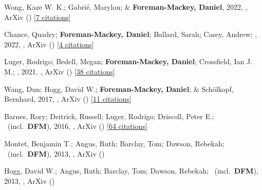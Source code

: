 \item[{\color{numcolor}\scriptsize7}] Wong, Kaze W. K.; Gabri{\'e}, Marylou; \& \textbf{Foreman-Mackey, Daniel}, 2022, , ArXiv () [\href{https://ui.adsabs.harvard.edu/abs/2022arXiv221106397W}{7 citations}]

\item[{\color{numcolor}\scriptsize6}] Chance, Quadry; \textbf{Foreman-Mackey, Daniel}; Ballard, Sarah; Casey, Andrew; \etal, 2022, , ArXiv () [\href{https://ui.adsabs.harvard.edu/abs/2022arXiv220611275C}{4 citations}]

\item[{\color{numcolor}\scriptsize5}] Luger, Rodrigo; Bedell, Megan; \textbf{Foreman-Mackey, Daniel}; Crossfield, Ian J. M.; \etal, 2021, , ArXiv () [\href{https://ui.adsabs.harvard.edu/abs/2021arXiv211006271L}{38 citations}]

\item[{\color{numcolor}\scriptsize4}] Wang, Dun; Hogg, David W.; \textbf{Foreman-Mackey, Daniel}; \& Sch{\"o}lkopf, Bernhard, 2017, , ArXiv () [\href{https://ui.adsabs.harvard.edu/abs/2017arXiv171002428W}{11 citations}]

\item[{\color{numcolor}\scriptsize3}] Barnes, Rory; Deitrick, Russell; Luger, Rodrigo; Driscoll, Peter E.; \etal\ (incl.\ \textbf{DFM}), 2016, , ArXiv () [\href{https://ui.adsabs.harvard.edu/abs/2016arXiv160806919B}{64 citations}]

\item[{\color{numcolor}\scriptsize2}] Montet, Benjamin T.; Angus, Ruth; Barclay, Tom; Dawson, Rebekah; \etal\ (incl.\ \textbf{DFM}), 2013, , ArXiv ()

\item[{\color{numcolor}\scriptsize1}] Hogg, David W.; Angus, Ruth; Barclay, Tom; Dawson, Rebekah; \etal\ (incl.\ \textbf{DFM}), 2013, , ArXiv ()